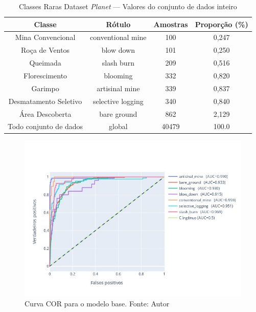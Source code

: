 \begin{table}[h!]
    \caption{Classes Raras Dataset \textit{Planet} — Valores do conjunto de dados inteiro}
    \centering
\begin{tabular}{*{4}{c}}
    \toprule
    Classe                  &            Rótulo &  Amostras      &  Proporção (\%) \\
    \midrule
    Mina Convencional       & conventional mine &        100     &       0,247 \\
    Roça de Ventos          &         blow down &        101     &       0,250 \\
    Queimada                &        slash burn &        209     &       0,516 \\
    Florescimento           &          blooming &        332     &       0,820 \\
    Garimpo                 &    artisinal mine &        339     &       0,837 \\
    Desmatamento Seletivo   & selective logging &        340     &       0,840 \\
    Área Descoberta         &       bare ground &        862     &       2,129 \\
    Todo conjunto de dados  &            global &        40479   &       100.0 \\
    \bottomrule
\end{tabular}
\label{table:Classes raras}
\end{table}

\begin{figure}[!ht]
    \centering
    \includegraphics[width=0.8\columnwidth]{Imagens/results/rsp-resnet-50_planet_pt/Curva COR para classes raras.jpg}
    \caption{ Curva COR para o modelo base. Fonte: Autor}
   \label{fig:CurvaCORResnet50}
\end{figure} 


